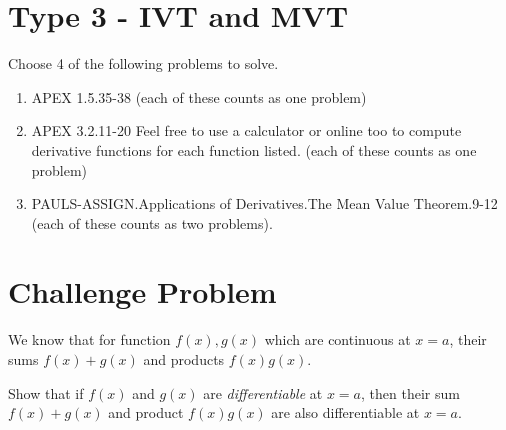 \documentclass[12pt]{article}
\begin{document}
\section{Type 3 - IVT and MVT}
Choose 4 of the following problems to solve.
\begin{enumerate}
  \item APEX 1.5.35-38 (each of these counts as one problem)
  \item APEX 3.2.11-20 Feel free to use a calculator or online too to compute derivative functions for each function listed. (each of these counts as one problem)
  \item PAULS-ASSIGN.Applications of Derivatives.The Mean Value Theorem.9-12 (each of these counts as two problems).
\end{enumerate}

\section{Challenge Problem}
We know that for function $f(x), g(x)$ which are continuous at $x = a$,
their sums $f(x) + g(x)$ and products $f(x)g(x)$.

Show that if $f(x)$ and $g(x)$ are \textit{differentiable} at $x = a$,
then their sum $f(x) + g(x)$ and product $f(x)g(x)$ are also differentiable
at $x = a$.


\end{document}
